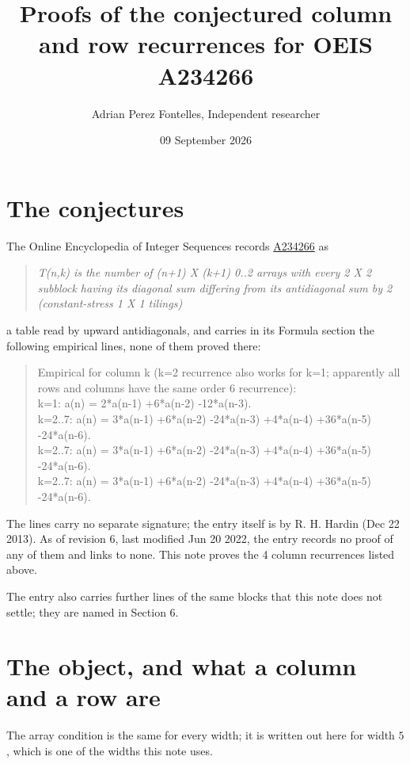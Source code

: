 \documentclass[11pt]{article}
\title{Proofs of the conjectured column and row recurrences for OEIS A234266}
\author{Adrian Perez Fontelles, Independent researcher}
\date{09 September 2026}
\theoremstyle{definition}
\begin{document}
\maketitle
\section{The conjectures}

The Online Encyclopedia of Integer Sequences records \href{https://oeis.org/A234266}{A234266} as

\begin{quote}\itshape T(n,k) is the number of (n+1) X (k+1) 0..2 arrays with every 2 X 2 subblock having its diagonal sum differing from its antidiagonal sum by 2 (constant-stress 1 X 1 tilings)\end{quote}

a table read by upward antidiagonals, and carries in its Formula section the following empirical lines, none of them proved there:

\begin{quote}\ttfamily Empirical for column k (k=2 recurrence also works for k=1; apparently all rows and columns have the same order 6 recurrence):\\
k=1: a(n) = 2*a(n-1) +6*a(n-2) -12*a(n-3).\\k=2..7: a(n) = 3*a(n-1) +6*a(n-2) -24*a(n-3) +4*a(n-4) +36*a(n-5) -24*a(n-6).\\k=2..7: a(n) = 3*a(n-1) +6*a(n-2) -24*a(n-3) +4*a(n-4) +36*a(n-5) -24*a(n-6).\\k=2..7: a(n) = 3*a(n-1) +6*a(n-2) -24*a(n-3) +4*a(n-4) +36*a(n-5) -24*a(n-6).\end{quote}

The lines carry no separate signature; the entry itself is by R. H. Hardin (Dec 22 2013). As of revision 6, last modified Jun 20 2022, the entry records no proof of any of them and links to none. This note proves the 4 column recurrences listed above.

The entry also carries further lines of the same blocks that this note does not settle; they are named in Section 6.

\section{The object, and what a column and a row are}

The array condition is the same for every width; it is written out here for width $5$, which is one of the widths this note uses.
\end{document}
